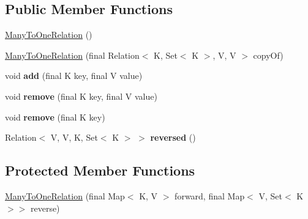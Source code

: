\subsection*{Public Member Functions}
\begin{DoxyCompactItemize}
\item 
\hyperlink{classosd_1_1util_1_1relation_1_1_many_to_one_relation_3_01_k_00_01_v_01_4_ac56d2bc8dd62b1d7ab3036f587198417}{Many\-To\-One\-Relation} ()
\item 
\hyperlink{classosd_1_1util_1_1relation_1_1_many_to_one_relation_3_01_k_00_01_v_01_4_abacd8dc859239fc64cfe911c97bf70a6}{Many\-To\-One\-Relation} (final Relation$<$ K, Set$<$ K $>$, V, V $>$ copy\-Of)
\item 
\hypertarget{classosd_1_1util_1_1relation_1_1_many_to_one_relation_3_01_k_00_01_v_01_4_a6874945591b5971c0aaa5fdda02a5af3}{void {\bfseries add} (final K key, final V value)}\label{classosd_1_1util_1_1relation_1_1_many_to_one_relation_3_01_k_00_01_v_01_4_a6874945591b5971c0aaa5fdda02a5af3}

\item 
\hypertarget{classosd_1_1util_1_1relation_1_1_many_to_one_relation_3_01_k_00_01_v_01_4_a6bd082b03892fa7d2281a407c82c115b}{void {\bfseries remove} (final K key, final V value)}\label{classosd_1_1util_1_1relation_1_1_many_to_one_relation_3_01_k_00_01_v_01_4_a6bd082b03892fa7d2281a407c82c115b}

\item 
\hypertarget{classosd_1_1util_1_1relation_1_1_many_to_one_relation_3_01_k_00_01_v_01_4_acbbdf0c3a1eaa14d1633ee99e64c0d98}{void {\bfseries remove} (final K key)}\label{classosd_1_1util_1_1relation_1_1_many_to_one_relation_3_01_k_00_01_v_01_4_acbbdf0c3a1eaa14d1633ee99e64c0d98}

\item 
\hypertarget{classosd_1_1util_1_1relation_1_1_many_to_one_relation_3_01_k_00_01_v_01_4_aa0a400f0e341ae6693869be1bca6a5f0}{Relation$<$ V, V, K, Set$<$ K $>$ $>$ {\bfseries reversed} ()}\label{classosd_1_1util_1_1relation_1_1_many_to_one_relation_3_01_k_00_01_v_01_4_aa0a400f0e341ae6693869be1bca6a5f0}

\end{DoxyCompactItemize}
\subsection*{Protected Member Functions}
\begin{DoxyCompactItemize}
\item 
\hyperlink{classosd_1_1util_1_1relation_1_1_many_to_one_relation_3_01_k_00_01_v_01_4_a60d0bfe083f2ed97a2084bef8ebf84fd}{Many\-To\-One\-Relation} (final Map$<$ K, V $>$ forward, final Map$<$ V, Set$<$ K $>$$>$ reverse)
\end{DoxyCompactItemize}


